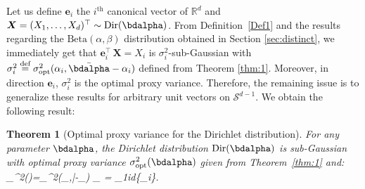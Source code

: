 \documentclass[15pt]{article}
\DeclareMathOperator{\Dir}{Dir}
\theoremstyle{plain}
\newtheorem{thm}{{Theorem}}%
\begin{document}
Let us define $\boldsymbol{e}_i$ the $i^{\text{th}}$ canonical vector of $\mathbb{R}^d$ and $\boldsymbol{X}=(X_1,\dots,X_d)^\top\sim\Dir(\bdalpha)$. From Definition~\ref{Def1} and the results regarding the $\text{Beta}(\alpha,\beta)$ distribution obtained in Section \ref{sec:distinct}, we immediately get that $\boldsymbol{e}_i^\top \, \boldsymbol{X}=X_i$ is $\sigma_i^2$-sub-Gaussian with $\sigma_i^2\overset{\text{def}}{=}\sigma_{\text{opt}}^2(\alpha_i,\bar{\bdalpha}-\alpha_i)$ defined from Theorem \ref{thm:1}. Moreover, in direction $\boldsymbol{e}_i$, $\sigma_i^2$ is the optimal proxy variance. Therefore, the remaining issue is to generalize these results for arbitrary unit vectors on $\mathcal{S}^{d-1}$. We obtain the following result:

\begin{thm}[Optimal proxy variance for the Dirichlet distribution]\label{thm:2}
For any parameter $\bdalpha$, the Dirichlet distribution $\Dir(\bdalpha)$ is sub-Gaussian with optimal proxy variance $\sigma_{\text{opt}}^2(\bdalpha)$ given from Theorem~\ref{thm:1} and:
\beqq \sigma_{}^2(\bdalpha)=\sigma_{}^2(\alpha_{},\bar{\bdalpha}-\alpha_{})
\quad{} \quad \alpha_{} = \max_{1\leq i\leq d}\{\alpha_i\}.
\eeqq
\end{thm}
\end{document}

